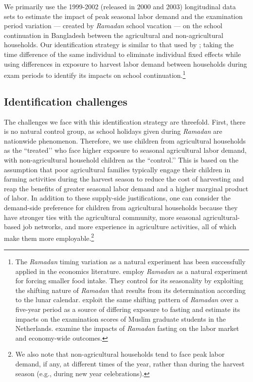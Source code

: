 \documentclass[12pt,letterpaper]{article}
\newcommand{\0}{\ensuremath{\mbox{\boldmath $0$}}}
\begin{document}
We primarily use the 1999-2002 (released in 2000 and 2003) longitudinal data sets to estimate the impact of peak seasonal labor demand and the examination period variation --- created by \textit{Ramadan} school vacation --- on the school continuation in Bangladesh between the agricultural and non-agricultural households. Our identification strategy is similar to that used by \citet{OosterbeekKlaauw2013}; taking the time difference of the same individual to eliminate individual fixed effects while using differences in exposure to harvest labor demand between households during exam periods to identify its impacts on school continuation.\footnote{The \textit{Ramadan} timing variation as a natural experiment has been successfully applied in the economics literature. \citet{AlmondMazumder2011} employ \textit{Ramadan} as a natural experiment for forcing smaller food intake. They control for its seasonality by exploiting the shifting nature of \textit{Ramadan} that results from its determination according to the lunar calendar. \citet{OosterbeekKlaauw2013} exploit the same shifting pattern of \textit{Ramadan} over a five-year period as a source of differing exposure to fasting and estimate its impacts on the examination scores of Muslim graduate students in the Netherlands. \citet{Campante2013} examine the impacts of \textit{Ramadan} fasting on the labor market and economy-wide outcomes.}

\subsection{Identification challenges \label{sec.identification_challange}}

The challenges we face with this identification strategy are threefold. First, there is no natural control group, as school holidays given during \textit{Ramadan} are nationwide phenomenon. Therefore, we use children from agricultural households as the ``treated’’ who face higher exposure to seasonal agricultural labor demand, with non-agricultural household children as the ``control.’’ This is based on the assumption that poor agricultural families typically engage their children in farming activities during the harvest season to reduce the cost of harvesting and reap the benefits of greater seasonal labor demand and a higher marginal product of labor. In addition to these supply-side justifications, one can consider the demand-side preference for children from agricultural households because they have stronger ties with the agricultural community, more seasonal agricultural-based job networks, and more experience in agriculture activities, all of which make them more employable.\footnote{We also note that non-agricultural households tend to face peak labor demand, if any, at different times of the year, rather than during the harvest season (e.g., during new year celebrations).}
\end{document}
